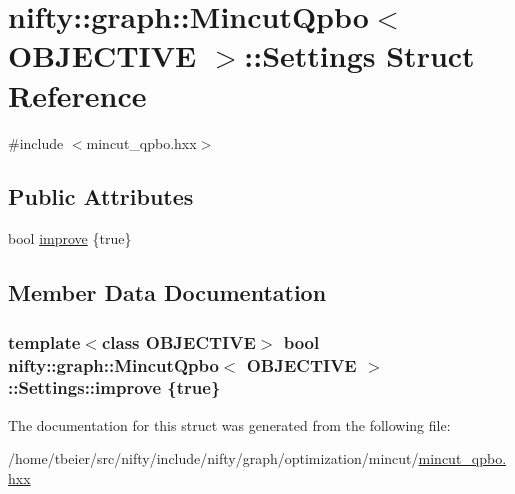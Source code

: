\hypertarget{structnifty_1_1graph_1_1MincutQpbo_1_1Settings}{}\section{nifty\+:\+:graph\+:\+:Mincut\+Qpbo$<$ O\+B\+J\+E\+C\+T\+I\+V\+E $>$\+:\+:Settings Struct Reference}
\label{structnifty_1_1graph_1_1MincutQpbo_1_1Settings}


{\ttfamily \#include $<$mincut\+\_\+qpbo.\+hxx$>$}

\subsection*{Public Attributes}
\begin{DoxyCompactItemize}
\item 
bool \hyperlink{structnifty_1_1graph_1_1MincutQpbo_1_1Settings_ab621c27b4bf66ebcf327e94dcb4c5f0e}{improve} \{true\}
\end{DoxyCompactItemize}


\subsection{Member Data Documentation}
\hypertarget{structnifty_1_1graph_1_1MincutQpbo_1_1Settings_ab621c27b4bf66ebcf327e94dcb4c5f0e}{}
\subsubsection[{improve}]{\setlength{\rightskip}{0pt plus 5cm}template$<$class O\+B\+J\+E\+C\+T\+I\+V\+E$>$ bool {\bf nifty\+::graph\+::\+Mincut\+Qpbo}$<$ O\+B\+J\+E\+C\+T\+I\+V\+E $>$\+::Settings\+::improve \{true\}}\label{structnifty_1_1graph_1_1MincutQpbo_1_1Settings_ab621c27b4bf66ebcf327e94dcb4c5f0e}


The documentation for this struct was generated from the following file\+:\begin{DoxyCompactItemize}
\item 
/home/tbeier/src/nifty/include/nifty/graph/optimization/mincut/\hyperlink{mincut__qpbo_8hxx}{mincut\+\_\+qpbo.\+hxx}\end{DoxyCompactItemize}
